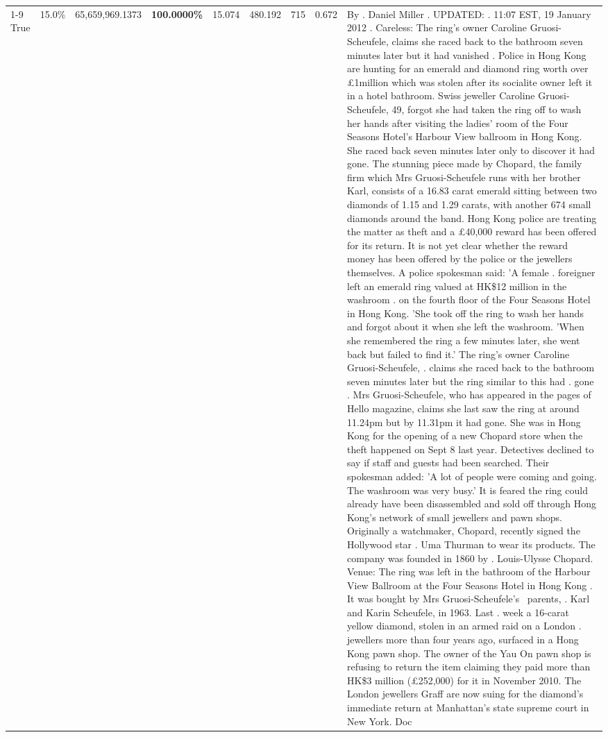 \begin{table}[H]
\begin{tabular}{lllrlllll}
\cline{1-9}
True & 15.0\% & 65,659,969.1373 & \bfseries \color{red} 100.0000\% & 15.074 & 480.192 & 715 & 0.672 & By . Daniel Miller . UPDATED: . 11:07 EST, 19 January 2012 . Careless: The ring's owner Caroline Gruosi-Scheufele, claims she raced back to the bathroom seven minutes later but it had vanished . Police in Hong Kong are hunting for an emerald and diamond ring worth over £1million which was stolen after its socialite owner left it in a hotel bathroom. Swiss jeweller Caroline Gruosi-Scheufele, 49, forgot she had taken the ring off to wash her hands after visiting the ladies' room of the Four Seasons Hotel's Harbour View ballroom in Hong Kong. She raced back seven minutes later only to discover it had gone. The stunning piece made by Chopard, the family firm which Mrs Gruosi-Scheufele runs with her brother Karl, consists of a 16.83 carat emerald sitting between two diamonds of 1.15 and 1.29 carats, with another 674 small diamonds around the band. Hong Kong police are treating the matter as theft and a £40,000 reward has been offered for its return. It is not yet clear whether the reward money has been offered by the police or the jewellers themselves. A police spokesman said: 'A female . foreigner left an emerald ring valued at HK\$12 million in the washroom . on the fourth floor of the Four Seasons Hotel in Hong Kong. 'She took off the ring to wash her hands and forgot about it when she left the washroom. 'When she remembered the ring a few minutes later, she went back but failed to find it.' The ring's owner Caroline Gruosi-Scheufele, . claims she raced back to the bathroom seven minutes later but the ring similar to this had . gone . Mrs Gruosi-Scheufele, who has appeared in the pages of Hello magazine, claims she last saw the ring at around 11.24pm but by 11.31pm it had gone. She was in Hong Kong for the opening of a new Chopard store when the theft happened on Sept 8 last year. Detectives declined to say if staff and guests had been searched. Their spokesman added: 'A lot of people were coming and going. The washroom was very busy.' It is feared the ring could already have been disassembled and sold off through Hong Kong's network of small jewellers and pawn shops. Originally a watchmaker, Chopard, recently signed the Hollywood star . Uma Thurman to wear its products. The company was founded in 1860 by . Louis-Ulysse Chopard. Venue: The ring was left in the bathroom of the Harbour View Ballroom at the Four Seasons Hotel in Hong Kong . It was bought by Mrs Gruosi-Scheufele's  parents, . Karl and Karin Scheufele, in 1963. Last . week a 16-carat yellow diamond, stolen in an armed raid on a London . jewellers more than four years ago, surfaced in a Hong Kong pawn shop. The owner of the Yau On pawn shop is refusing to return the item claiming they paid more than HK\$3 million (£252,000) for it in November 2010. The London jewellers Graff are now suing for the diamond’s immediate return at Manhattan’s state supreme court in New York. Doc \\

\end{tabular}
\end{table}
